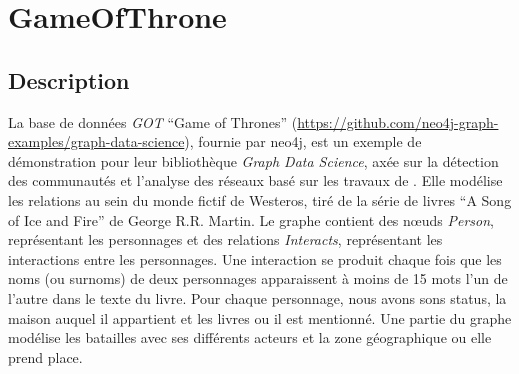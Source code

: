 \section{GameOfThrone}

\subsection{Description}

La base de données \emph{GOT} \enquote{Game of Thrones} (\url{https://github.com/neo4j-graph-examples/graph-data-science}), fournie par \gls{neo4j}, est un exemple de démonstration pour leur bibliothèque \emph{Graph Data Science}, axée sur la détection des communautés et l'analyse des réseaux basé sur les travaux de \cite{beveridgeNetworkThrones2016}.
Elle modélise les relations au sein du monde fictif de Westeros, tiré de la série de livres \enquote{A Song of Ice and Fire} de George R.R. Martin.
Le graphe contient des nœuds \emph{Person}, représentant les personnages et des relations \emph{Interacts}, représentant les interactions entre les personnages.
Une interaction se produit chaque fois que les noms (ou surnoms) de deux personnages apparaissent à moins de 15 mots l'un de l'autre dans le texte du livre.
Pour chaque personnage, nous avons sons status, la maison auquel il appartient et les livres ou il est mentionné.
Une partie du graphe modélise les batailles avec ses différents acteurs et la zone géographique ou elle prend place.

